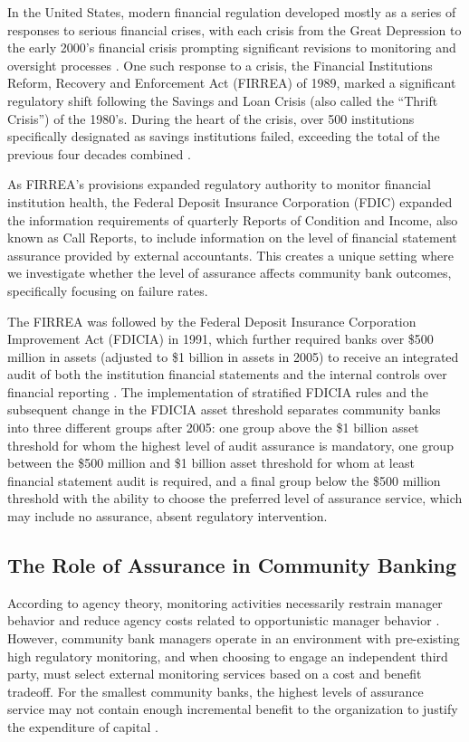 \documentclass[12pt]{article}
\begin{document}
In the United States, modern financial regulation developed mostly as a series of responses to serious financial crises, with each crisis from the Great Depression to the early 2000's financial crisis prompting significant revisions to monitoring and oversight processes \citep{KandracMarsh2025}. One such response to a crisis, the Financial Institutions Reform, Recovery and Enforcement Act (FIRREA) of 1989, marked a significant regulatory shift following the Savings and Loan Crisis (also called the ``Thrift Crisis'') of the 1980's. During the heart of the crisis, over 500 institutions specifically designated as savings institutions failed, exceeding the total of the previous four decades combined \citep{Clark1989}.

As FIRREA's provisions expanded regulatory authority to monitor financial institution health, the Federal Deposit Insurance Corporation (FDIC) expanded the information requirements of quarterly Reports of Condition and Income, also known as Call Reports, to include information on the level of financial statement assurance provided by external accountants. This creates a unique setting where we investigate whether the level of assurance affects community bank outcomes, specifically focusing on failure rates.

The FIRREA was followed by the Federal Deposit Insurance Corporation Improvement Act (FDICIA) in 1991, which further required banks over \$500 million in assets (adjusted to \$1 billion in assets in 2005) to receive an integrated audit of both the institution financial statements and the internal controls over financial reporting \citep{Akhigbe2001, Jin2013b}. The implementation of stratified FDICIA rules and the subsequent change in the FDICIA asset threshold separates community banks into three different groups after 2005: one group above the \$1 billion asset threshold for whom the highest level of audit assurance is mandatory, one group between the \$500 million and \$1 billion asset threshold for whom at least financial statement audit is required, and a final group below the \$500 million threshold with the ability to choose the preferred level of assurance service, which may include no assurance, absent regulatory intervention.

\subsection{The Role of Assurance in Community Banking}

According to agency theory, monitoring activities necessarily restrain manager behavior and reduce agency costs related to opportunistic manager behavior \citep{JensenMeckling1976}. However, community bank managers operate in an environment with pre-existing high regulatory monitoring, and when choosing to engage an independent third party, must select external monitoring services based on a cost and benefit tradeoff. For the smallest community banks, the highest levels of assurance service may not contain enough incremental benefit to the organization to justify the expenditure of capital \citep{AbdelKhalik1993}.
\end{document}
